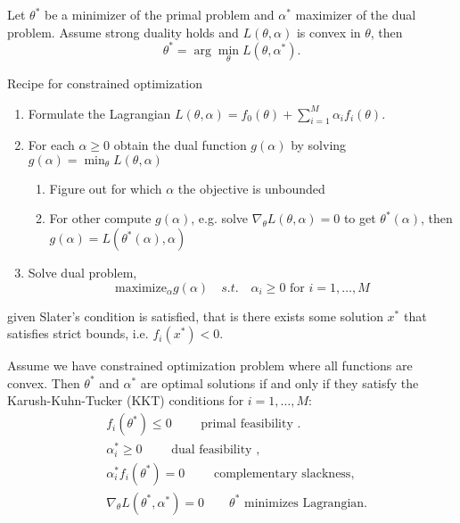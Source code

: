 \documentclass[12 pt]{article}        	%
\begin{document}
\begin{lem}
    Let $ \theta^* $ be a minimizer of the primal problem and $ \alpha^* $ maximizer of the dual problem.
    Assume strong duality holds and $ L ( \theta , \alpha ) $ is convex in $ \theta $, then 
    \[
        \theta^* 
        = 
        \arg \min_{ \theta } L ( \theta , \alpha^* ). 
    \]
\end{lem}

\begin{prop}
    \label{recipe_constrained_optimization}
    Recipe for constrained optimization
    \begin{enumerate}
        \item 
        Formulate the Lagrangian $ L ( \theta , \alpha ) = f_0 ( \theta ) + \sum_{ i = 1 }^M \alpha_i f_i ( \theta ) $.

        \item
        For each $\alpha \geq 0 $ obtain the dual function $ g ( \alpha ) $ by solving $ g ( \alpha ) = \min_{ \theta } L ( \theta , \alpha ) $
        \begin{enumerate}
            \item 
            Figure out for which $ \alpha $ the objective is unbounded 

            \item 
            For other compute $ g ( \alpha ) $, e.g. solve $ \nabla_\theta L ( \theta , \alpha ) = 0 $ to get $ \theta^* ( \alpha ) $, then 
            $ g ( \alpha ) = L ( \theta^* ( \alpha ) , \alpha ) $
        \end{enumerate}

        \item 
        Solve dual problem,
        \[
            \text{maximize}_\alpha g ( \alpha ) 
            \quad 
            s.t.
            \quad 
            \alpha_i \geq 0 \text{ for } i = 1 , \dotsc , M 
        \]
    \end{enumerate}
    given Slater's condition is satisfied, that is there exists some solution $ x^* $ that satisfies strict bounds, i.e. $ f_i ( x^* ) < 0 $.
\end{prop}


\begin{lem}
    Assume we have constrained optimization problem where all functions are convex.
    Then $ \theta^* $ and $ \alpha^* $ are optimal solutions if and only if they satisfy the Karush-Kuhn-Tucker (KKT) conditions for $ i = 1 , \dotsc , M $:
    \begin{align*}
        &f_i ( \theta^* ) \leq 0 \qquad \text{ primal feasibility }.
        \\
        &\alpha_i^* \geq 0 \qquad \text{ dual feasibility },
        \\
        & \alpha_i^* f_i ( \theta^* ) = 0 \qquad \text{ complementary slackness, }
        \\
        & \nabla_{ \theta } L ( \theta^* , \alpha^* ) = 0 \qquad \theta^* \text{ minimizes Lagrangian.}
    \end{align*}
\end{lem}
\end{document}
